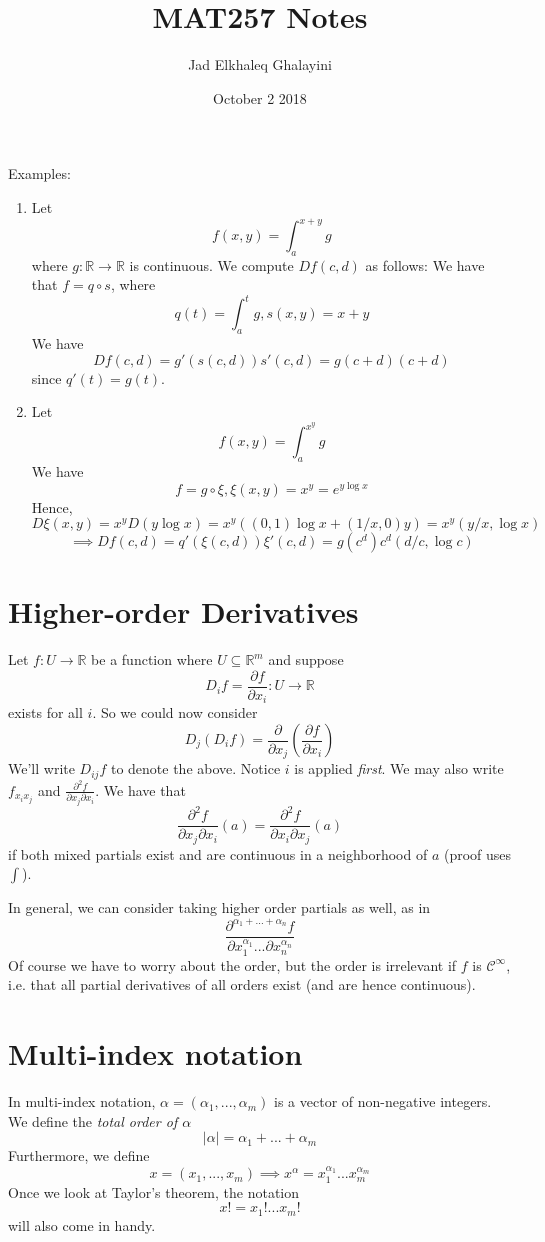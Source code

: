 \documentclass{article}
\title{MAT257 Notes}
\author{Jad Elkhaleq Ghalayini}
\date{October 2 2018}
\newcommand{\reals}[0]{\mathbb{R}}
\newcommand{\mc}[1]{\mathcal{#1}}
\newcommand{\prt}[2]{\frac{\partial #1}{\partial #2}}
\begin{document}
\maketitle

Examples:
\begin{enumerate}
  \item Let \[f(x, y) = \int_a^{x + y}g\] where \(g: \reals \to \reals\) is continuous. We compute \(Df(c, d)\) as follows:
  We have that \(f = q \circ s\), where
  \[q(t) = \int_a^tg, s(x, y) = x + y\]
  We have
  \[Df(c, d) =  g'(s(c, d))s'(c, d) = g(c + d)(c + d)\]
  since \(q'(t) = g(t)\).

  \item Let \[f(x, y) = \int_a^{x^y}g\] We have
  \[f = g \circ \xi, \xi(x, y) = x^y = e^{y\log x}\]
  Hence,
  \[D\xi(x, y) = x^yD(y\log x) = x^y((0, 1)\log x + (1/x, 0)y) = x^y(y/x, \log x)\]
  \[\implies Df(c, d) = q'(\xi(c, d))\xi'(c, d) = g(c^d)c^d(d/c, \log c)\]
\end{enumerate}

\section*{Higher-order Derivatives}
Let \(f: U \to \reals\) be a function where \(U \subseteq \reals^m\) and suppose
\[D_if = \prt{f}{x_i}: U \to \reals\]
exists for all \(i\). So we could now consider
\[D_j(D_if) = \prt{}{x_j}\left(\prt{f}{x_i}\right)\]
We'll write \(D_{ij}f\) to denote the above. Notice \(i\) is applied \textit{first}. We may also write \(f_{x_ix_j}\) and \(\frac{\partial^2 f}{\partial x_j \partial x_i}\). We have that
\[\frac{\partial^2 f}{\partial x_j \partial x_i}(a) = \frac{\partial^2 f}{\partial x_i \partial x_j}(a)\]
if both mixed partials exist and are continuous in a neighborhood of \(a\) (proof uses \(\int\)).

In general, we can consider taking higher order partials as well, as in
\[\frac{\partial^{\alpha_1 + ... + \alpha_n}f}{\partial x_1^{\alpha_1} ... \partial x_n^{\alpha_n}}\]
Of course we have to worry about the order, but the order is irrelevant if \(f\) is \(\mc{C}^\infty\), i.e. that all partial derivatives of all orders exist (and are hence continuous).

\section*{Multi-index notation}
In multi-index notation, \(\alpha = (\alpha_1,...,\alpha_m)\) is a vector of non-negative integers. We define the \textit{total order of \(\alpha\)}
\[|\alpha| = \alpha_1 + ... + \alpha_m\]
Furthermore, we define
\[x = (x_1,...,x_m) \implies x^\alpha = x_1^{\alpha_1}...x_m^{\alpha_m}\]
Once we look at Taylor's theorem, the notation
\[x! = x_1!...x_m!\]
will also come in handy.
\end{document}
